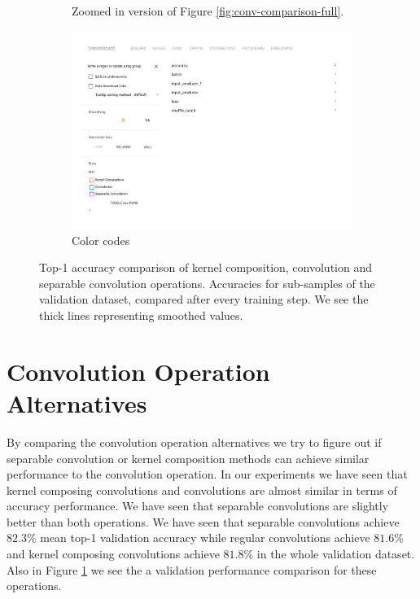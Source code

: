 \begin{figure}
\begin{subfigure}{.79\textwidth}
        \caption{Zoomed in version of Figure \ref{fig:conv-comparison-full}.}
  \end{subfigure}
  \begin{subfigure}{.49\textwidth}
        \includegraphics[width=1\linewidth]{images/convolution-comparison-legend.pdf}
        \caption{Color codes}
  \end{subfigure}
  \caption{Top-1 accuracy comparison of kernel composition, convolution and separable convolution operations. Accuracies for sub-samples of the validation dataset, compared after every training step. We see the thick lines representing smoothed values.}
  \label{fig:conv-comparison}
\end{figure}

\section{Convolution Operation Alternatives}
By comparing the convolution operation alternatives we try to figure out if separable convolution or kernel composition methods can achieve similar performance to the convolution operation. In our experiments we have seen that kernel composing convolutions and convolutions are almost similar in terms of accuracy performance. We have seen that separable convolutions are slightly better than both operations. We have seen that separable convolutions achieve $82.3\%$ mean top-1 validation accuracy while regular convolutions achieve $81.6\%$ and kernel composing convolutions achieve $81.8\%$ in the whole validation dataset. Also in Figure \ref{fig:conv-comparison} we see the a validation performance comparison for these operations. 

